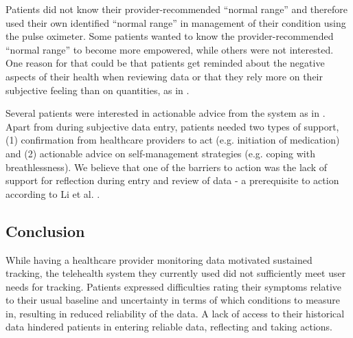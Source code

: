 Patients did not know their provider-recommended “normal range” and therefore used their own identified “normal range” in management of their condition using the pulse oximeter. Some patients wanted to know the provider-recommended “normal range” to become more empowered, while others were not interested. One reason for that could be that patients get reminded about the negative aspects of their health when reviewing data or that they rely more on their subjective feeling than on quantities, as in \cite{Ancker2015}. 

Several patients were interested in actionable advice from the system as in \cite{Chung2015, Li2010}. Apart from during subjective data entry, patients needed two types of support, (1) confirmation from healthcare providers to act (e.g. initiation of medication) and (2) actionable advice on self-management strategies (e.g. coping with breathlessness). We believe that one of the barriers to action was the lack of support for reflection during entry and review of data  - a prerequisite to action according to Li et al. \cite{Li2010}.

\subsection{Conclusion}
While having a healthcare provider monitoring data motivated sustained tracking, the telehealth system they currently used did not sufficiently meet user needs for tracking. Patients expressed difficulties rating their symptoms relative to their usual baseline and uncertainty in terms of which conditions to measure in, resulting in reduced reliability of the data. A lack of access to their historical data hindered patients in entering reliable data, reflecting and taking actions. 